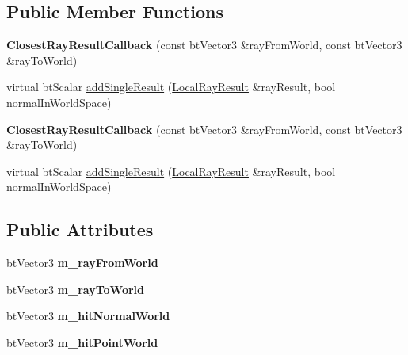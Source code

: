 \subsection*{Public Member Functions}
\begin{DoxyCompactItemize}
\item 
\mbox{\label{structbtCollisionWorld_1_1ClosestRayResultCallback_a63c270257d511fc2404dc3117a09151b}} 
{\bfseries Closest\+Ray\+Result\+Callback} (const bt\+Vector3 \&ray\+From\+World, const bt\+Vector3 \&ray\+To\+World)
\item 
virtual bt\+Scalar \hyperlink{structbtCollisionWorld_1_1ClosestRayResultCallback_a36afc6c41a6f7576a9b6d23771cf8fc4}{add\+Single\+Result} (\hyperlink{structbtCollisionWorld_1_1LocalRayResult}{Local\+Ray\+Result} \&ray\+Result, bool normal\+In\+World\+Space)
\item 
\mbox{\label{structbtCollisionWorld_1_1ClosestRayResultCallback_a63c270257d511fc2404dc3117a09151b}} 
{\bfseries Closest\+Ray\+Result\+Callback} (const bt\+Vector3 \&ray\+From\+World, const bt\+Vector3 \&ray\+To\+World)
\item 
virtual bt\+Scalar \hyperlink{structbtCollisionWorld_1_1ClosestRayResultCallback_a36afc6c41a6f7576a9b6d23771cf8fc4}{add\+Single\+Result} (\hyperlink{structbtCollisionWorld_1_1LocalRayResult}{Local\+Ray\+Result} \&ray\+Result, bool normal\+In\+World\+Space)
\end{DoxyCompactItemize}
\subsection*{Public Attributes}
\begin{DoxyCompactItemize}
\item 
\mbox{\label{structbtCollisionWorld_1_1ClosestRayResultCallback_a7f39bb6da984035fcc5ff1f53b587e83}} 
bt\+Vector3 {\bfseries m\+\_\+ray\+From\+World}
\item 
\mbox{\label{structbtCollisionWorld_1_1ClosestRayResultCallback_a7fdbdd4a5688f4677ac24cbf2d3ba65a}} 
bt\+Vector3 {\bfseries m\+\_\+ray\+To\+World}
\item 
\mbox{\label{structbtCollisionWorld_1_1ClosestRayResultCallback_acafc99a2109d9a77bd50adc5de111721}} 
bt\+Vector3 {\bfseries m\+\_\+hit\+Normal\+World}
\item 
\mbox{\label{structbtCollisionWorld_1_1ClosestRayResultCallback_a9c6f6d2ffdb0420674bb928324677f76}} 
bt\+Vector3 {\bfseries m\+\_\+hit\+Point\+World}
\end{DoxyCompactItemize}



